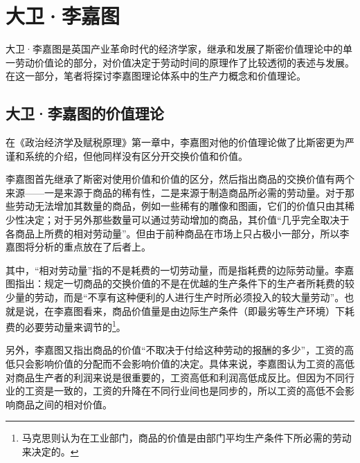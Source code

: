 \section{大卫·李嘉图}

大卫·李嘉图是英国产业革命时代的经济学家，继承和发展了斯密价值理论中的单一劳动价值论的部分，对价值决定于劳动时间的原理作了比较透彻的表述与发展\cite[iv]{DaWei*LiJiaTuZhengZhiJingJiXueJiFuShuiYuanLi2021}。在这一部分，笔者将探讨李嘉图理论体系中的生产力概念和价值理论。

\subsection{大卫·李嘉图的价值理论}

在《政治经济学及赋税原理》第一章中，李嘉图对他的价值理论做了比斯密更为严谨和系统的介绍，但他同样没有区分开交换价值和价值。

李嘉图首先继承了斯密对使用价值和价值的区分，然后指出商品的交换价值有两个来源——一是来源于商品的稀有性，二是来源于制造商品所必需的劳动量\cite[5-6]{DaWei*LiJiaTuZhengZhiJingJiXueJiFuShuiYuanLi2021}。对于那些劳动无法增加其数量的商品，例如一些稀有的雕像和图画，它们的价值只由其稀少性决定；对于另外那些数量可以通过劳动增加的商品，其价值“几乎完全取决于各商品上所费的相对劳动量”。\cite[6]{DaWei*LiJiaTuZhengZhiJingJiXueJiFuShuiYuanLi2021}但由于前种商品在市场上只占极小一部分，所以李嘉图将分析的重点放在了后者上。

其中，“相对劳动量”指的不是耗费的一切劳动量，而是指耗费的边际劳动量\cite[16]{LiRenJunJieZhiLiLun2004}。李嘉图指出：规定一切商品的交换价值的不是在优越的生产条件下的生产者所耗费的较少量的劳动，而是“不享有这种便利的人进行生产时所必须投入的较大量劳动”\cite[58]{DaWei*LiJiaTuZhengZhiJingJiXueJiFuShuiYuanLi2021}。也就是说，在李嘉图看来，商品价值量是由边际生产条件（即最劣等生产环境）下耗费的必要劳动量来调节的\cite[9]{ChenZhenYuLunSheHuiBiYaoLaoDongShiJianXueShuoCongGuDianXuePaiDaoMaKeSiDeFaZhan1990}\footnote{马克思则认为在工业部门，商品的价值是由部门平均生产条件下所必需的劳动来决定的\cite[16]{LiRenJunJieZhiLiLun2004}。}。

另外，李嘉图又指出商品的价值“不取决于付给这种劳动的报酬的多少”\cite[5]{DaWei*LiJiaTuZhengZhiJingJiXueJiFuShuiYuanLi2021}，工资的高低只会影响价值的分配而不会影响价值的决定。具体来说，李嘉图认为工资的高低对商品生产者的利润来说是很重要的，工资高低和利润高低成反比。但因为不同行业的工资是一致的，工资的升降在不同行业间也是同步的，所以工资的高低不会影响商品之间的相对价值\cite[19]{DaWei*LiJiaTuZhengZhiJingJiXueJiFuShuiYuanLi2021}。

